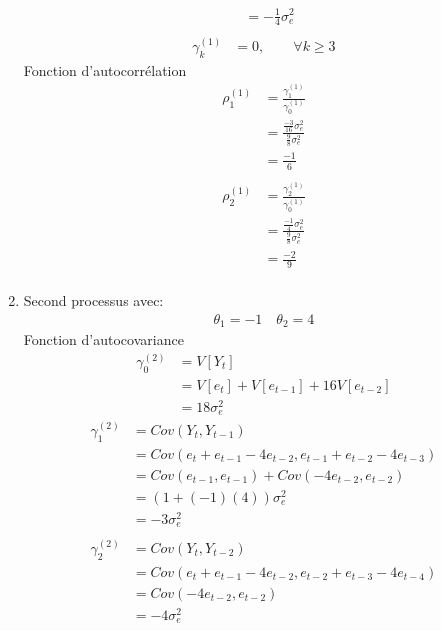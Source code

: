 \documentclass{article}
\begin{document}
\begin{enumerate}
\begin{align*}
    &= -\frac{1}{4} \sigma^2_e \\
  \end{align*}
  \begin{align*}
    \gamma_k^{(1)} &= 0, \qquad \forall k \geq 3
   \end{align*}
   Fonction d'autocorrélation
   \begin{align*}
     \rho_1^{(1)} &= \frac{\gamma_1^{(1)}}{\gamma_0^{(1)}} \\
     &= \frac{\frac{-3}{16}\sigma^2_e}{\frac{9}{8}\sigma^2_e} \\
     &= \frac{-1}{6} \\
   \end{align*}
   \begin{align*}
     \rho_2^{(1)} &= \frac{\gamma_2^{(1)}}{\gamma_0^{(1)}} \\
     &= \frac{\frac{-1}{4}\sigma^2_e}{\frac{9}{8}\sigma^2_e} \\
     &= \frac{-2}{9} \\
   \end{align*}
 \item Second processus avec:
   \begin{align*}
     \theta_1 = -1 \quad \theta_2 = 4
   \end{align*}
   Fonction d'autocovariance
   \begin{align*}
     \gamma_0^{(2)} &= V[Y_t] \\
     &= V[e_t]+V[e_{t-1}]+16V[e_{t-2}] \\
     &= 18 \sigma^2_e
   \end{align*}
   \begin{align*}
     \gamma_1^{(2)} &= Cov(Y_t,Y_{t-1}) \\
     &= Cov(e_t + e_{t-1} - 4e_{t-2}, e_{t-1} + e_{t-2} - 4e_{t-3}) \\
     &= Cov(e_{t-1},e_{t-1}) + Cov(-4e_{t-2},e_{t-2}) \\
     &= (1 + (-1)(4))\sigma^2_e \\
     &= -3\sigma^2_e \\
   \end{align*}
   \begin{align*}
     \gamma_2^{(2)} &= Cov(Y_t,Y_{t-2}) \\
     &= Cov(e_t + e_{t-1} - 4e_{t-2}, e_{t-2} + e_{t-3} - 4e_{t-4} )\\
     &= Cov(- 4e_{t-2},e_{t-2}) \\
     &= -4\sigma^2_e \\
   \end{align*}

\end{enumerate}
\end{document}

